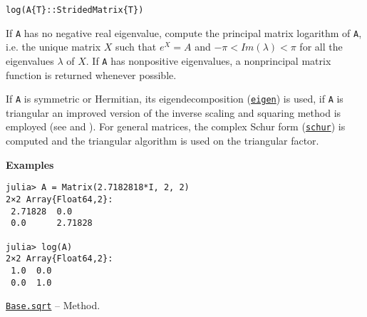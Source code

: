 \begin{adjustwidth}{2em}{0pt}


\begin{verbatim}
log(A{T}::StridedMatrix{T})
\end{verbatim}

If \texttt{A} has no negative real eigenvalue, compute the principal matrix logarithm of \texttt{A}, i.e. the unique matrix \(X\) such that \(e^X = A\) and \(-\pi < Im(\lambda) < \pi\) for all the eigenvalues \(\lambda\) of \(X\). If \texttt{A} has nonpositive eigenvalues, a nonprincipal matrix function is returned whenever possible.

If \texttt{A} is symmetric or Hermitian, its eigendecomposition (\hyperlink{11056016707394839114}{\texttt{eigen}}) is used, if \texttt{A} is triangular an improved version of the inverse scaling and squaring method is employed (see \footnotemark[9] and \footnotemark[10]). For general matrices, the complex Schur form (\hyperlink{17132870828407138368}{\texttt{schur}}) is computed and the triangular algorithm is used on the triangular factor.

\textbf{Examples}


\begin{verbatim}
julia> A = Matrix(2.7182818*I, 2, 2)
2×2 Array{Float64,2}:
 2.71828  0.0
 0.0      2.71828

julia> log(A)
2×2 Array{Float64,2}:
 1.0  0.0
 0.0  1.0
\end{verbatim}



\end{adjustwidth}
\hypertarget{5923364455521980754}{} 
\hyperlink{5923364455521980754}{\texttt{Base.sqrt}}  -- {Method.}

